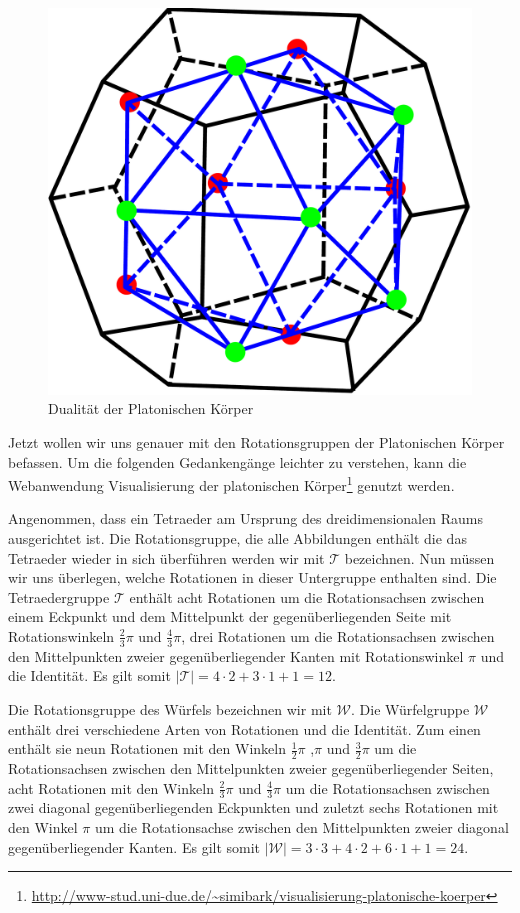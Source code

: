 \begin{figure}[H]
\centering
\includegraphics[width=0.4\linewidth]{grafiken/dual_dodekaeder.pdf}
\caption{Dualität der Platonischen Körper}
\label{fig:Duality_Dodek-Iso}
\end{figure}

Jetzt wollen wir uns genauer mit den Rotationsgruppen der Platonischen Körper befassen. Um die folgenden Gedankengänge leichter zu verstehen, kann die Webanwendung Visualisierung der platonischen Körper\footnote{\url{http://www-stud.uni-due.de/~simibark/visualisierung-platonische-koerper}} genutzt werden.

Angenommen, dass ein Tetraeder am Ursprung des dreidimensionalen Raums ausgerichtet ist. Die Rotationsgruppe, die alle Abbildungen enthält die das Tetraeder wieder in sich überführen werden wir mit $\mathcal{T}$ bezeichnen. Nun müssen wir uns überlegen, welche Rotationen in dieser Untergruppe enthalten sind. Die Tetraedergruppe $\mathcal{T}$ enthält acht Rotationen um die Rotationsachsen zwischen einem Eckpunkt und dem Mittelpunkt der gegenüberliegenden Seite mit Rotationswinkeln $\frac{2}{3}\pi$ und $\frac{4}{3}\pi$, drei Rotationen um die Rotationsachsen zwischen den Mittelpunkten zweier gegenüberliegender Kanten mit Rotationswinkel $\pi$ und die Identität. Es gilt somit $| \mathcal{T} | = 4 \cdot 2 + 3 \cdot 1 + 1 = 12$.

Die Rotationsgruppe des Würfels bezeichnen wir mit $\mathcal{W}$. Die Würfelgruppe $\mathcal{W}$ enthält drei verschiedene Arten von Rotationen und die Identität. Zum einen enthält sie neun Rotationen mit den Winkeln $\frac{1}{2}\pi$ ,$\pi$ und $\frac{3}{2}\pi$ um die Rotationsachsen zwischen den Mittelpunkten zweier gegenüberliegender Seiten, acht Rotationen mit den Winkeln $\frac{2}{3}\pi$ und $\frac{4}{3}\pi$ um die Rotationsachsen zwischen zwei diagonal gegenüberliegenden Eckpunkten und zuletzt sechs Rotationen mit den Winkel $\pi$ um die Rotationsachse zwischen den Mittelpunkten zweier diagonal gegenüberliegender Kanten. Es gilt somit $| \mathcal{W} | = 3 \cdot 3 + 4 \cdot 2 + 6 \cdot 1 + 1 = 24$.

